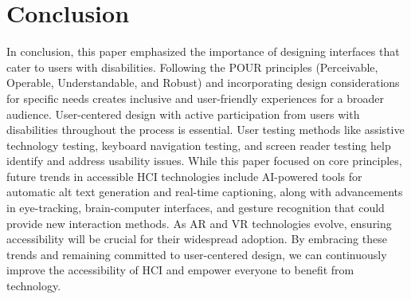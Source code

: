 \section{Conclusion}

In conclusion, this paper emphasized the importance of designing interfaces that
cater to users with disabilities. Following the POUR principles (Perceivable,
Operable, Understandable, and Robust) and incorporating design considerations
for specific needs creates inclusive and user-friendly experiences for a broader
audience. User-centered design with active participation from users with
disabilities throughout the process is essential. User testing methods like
assistive technology testing, keyboard navigation testing, and screen reader
testing help identify and address usability issues. While this paper focused on
core principles, future trends in accessible HCI technologies include AI-powered
tools for automatic alt text generation and real-time captioning, along with
advancements in eye-tracking, brain-computer interfaces, and gesture recognition
that could provide new interaction methods. As AR and VR technologies evolve,
ensuring accessibility will be crucial for their widespread adoption. By
embracing these trends and remaining committed to user-centered design, we can
continuously improve the accessibility of HCI and empower everyone to benefit
from technology.
